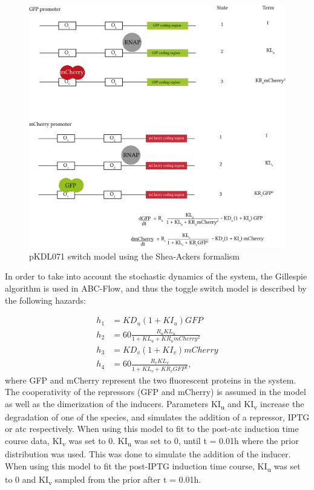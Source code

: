\begin{figure}[tb]
\centerfloat
	\includegraphics[width=\textwidth]{../../chapters/chapterABCFlow/images/shea-ackers_flow.png}
	\caption[pKDL071 switch model using the Shea-Ackers formalism]{\label{fig:shea-flow}pKDL071 switch model using the Shea-Ackers formalism}
\end{figure}



In order to take into account the stochastic dynamics of the system, the Gillespie algorithm is used in ABC-Flow, and thus the toggle switch model is described by the following hazards:

\begin{align}
h_1 &= KD_u  (1 + KI_u)  GFP\\
h_2 &= 60  \frac{R_u KL_u}{1 + KL_u + KR_u  mCherry^2}\\
h_3 &= KD_v  (1 + KI_v)  mCherry\\
h_4 &= 60  \frac{R_v  KL_v}{1+ KL_v + KR_v  GFP^2},
\end{align}    
\noindent where GFP and mCherry represent the two fluorescent proteins in the system. The cooperativity of the repressors (GFP and mCherry) is assumed in the model as well as the dimerization of the inducers. Parameters KI\textsubscript{u} and KI\textsubscript{v} increase the degradation of one of the species, and simulates the addition of a repressor, IPTG or \acrshort{atc} respectively. When using this model to fit to the post-\acrshort{atc} induction time course data, KI\textsubscript{v} was set to 0. KI\textsubscript{u} was set to 0, until t = 0.01h where the prior distribution was used. This was done to simulate the addition of the inducer. When using this model to fit the post-IPTG induction time course, KI\textsubscript{u} was set to 0 and KI\textsubscript{v} sampled from the prior after t = 0.01h. 

